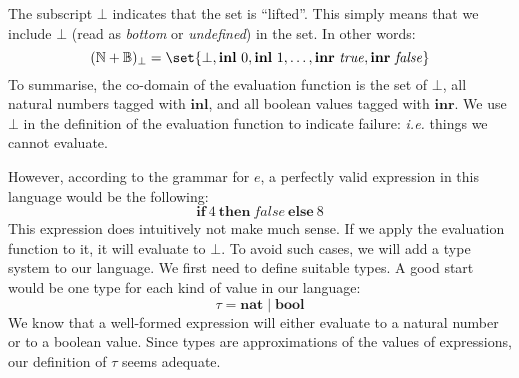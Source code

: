 The subscript $\bot$ indicates that the set is ``lifted''. This simply means that we include $\bot$ (read as \emph{bottom} or \emph{undefined}) in the set. In other words:
\begin{displaymath}
(\mathbb{N} + \mathbb{B})_{\bot} = \set{\bot, \mathbf{inl}~0,\mathbf{inl}~1, \ldots, \mathbf{inr}~\mathit{true}, \mathbf{inr}~\mathit{false}}
\end{displaymath}
To summarise, the co-domain of the evaluation function is the set of $\bot$, all natural numbers tagged with $\mathbf{inl}$, and all boolean values tagged with $\mathbf{inr}$. We use $\bot$ in the definition of the evaluation function to indicate failure: \emph{i.e.} things we cannot evaluate.

However, according to the grammar for $e$, a perfectly valid expression in this language would be the following:
\begin{displaymath}
\mathbf{if}~4~\mathbf{then}~\mathit{false}~\mathbf{else}~8
\end{displaymath}
This expression does intuitively not make much sense. If we apply the evaluation function to it, it will evaluate to $\bot$. To avoid such cases, we will add a type system to our language. We first need to define suitable types. A good start would be one type for each kind of value in our language: 
\begin{displaymath}
\tau = \mathbf{nat} \mid \mathbf{bool}
\end{displaymath}
We know that a well-formed expression will either evaluate to a natural number or to a boolean value. Since types are approximations of the values of expressions, our definition of $\tau$ seems adequate.

